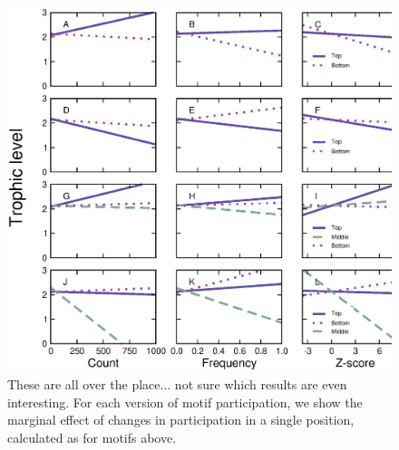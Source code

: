\documentclass[12pt]{article}
\begin{document}
    \begin{figure}[ht!]
        \centering
        \includegraphics[width=\textwidth]{figures/positions_vs_TL.eps}
        \caption{These are all over the place... not sure which results are even interesting. For each version of motif participation, we show the marginal effect of changes in participation in a single position, calculated as for motifs above.}
        \label{fig:positions_TL}
    \end{figure}

\clearpage
\end{document}
